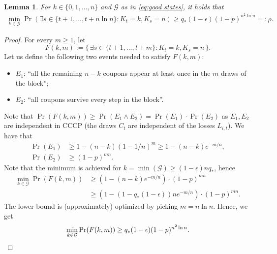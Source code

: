 \documentclass[11pt,a4paper]{article}
\newtheorem{lemma}[theorem]{Lemma}
\begin{document}
\begin{lemma}\label{lemma:rho}
For $k \in \{0,1,\ldots,n\}$ and $\mathcal{G}$ as in \cref{eq:good states}, it holds that
\begin{align*}
    \min_{k \in \mathcal{G}} \Pr( \exists s \in \{t+1,\ldots,t + n \ln n\} : K_t = k, K_s = n )
    \ge q_* (1-\epsilon) (1-p)^{n^2 \ln n} =: \rho.
\end{align*}
\end{lemma}
\begin{proof}
For every $m \ge 1$, let 
\[
    F(k,m) := \{\, \exists s \in \{t+1,\ldots,t+m\} : K_t = k, K_s = n \,\}.
\]
Let us define the following two events needed to satisfy $F(k,m)$:
\begin{itemize}
    \item $E_1$: ``all the remaining $n-k$ coupons appear at least once in the $m$ draws of the block'';
    \item $E_2$: ``all coupons survive every step in the block''.
\end{itemize}
Note that $\Pr(F(k,m)) \ge \Pr(E_1 \land E_2) = \Pr(E_1) \cdot \Pr(E_2)$ as $E_1,E_2$ are independent in CCCP (the draws $C_t$ are independent of the losses $L_{i,t}$).
We have that
\begin{align*}
    \Pr(E_1) &\ge 1 - (n-k)(1-1/n)^m \ge 1-(n-k)e^{-m/n},
    \\
    \Pr(E_2) &\ge (1-p)^{mn}.
\end{align*}
Note that the minimum is achieved for $k = \min(\mathcal{G}) \ge (1-\epsilon)nq_*$, hence
\begin{align*}
    \min_{k \in \mathcal{G}} \Pr( F(k,m) ) 
    &\ge (1 - (n-k)e^{-m/n} ) \cdot (1-p)^{mn}
    \\
    &\ge (1 - (1- q_*(1-\epsilon))ne^{-m/n} ) \cdot (1-p)^{mn}.
\end{align*}
The lower bound is (approximately) optimized by picking $m = n \ln n$. Hence, we get
\[
    \min_{k \in \mathcal{G}} \Pr( F(k,m) ) 
    \ge q_* (1-\epsilon) (1-p)^{n^2 \ln n}.
    \qedhere
\]
\end{proof}
\end{document}
